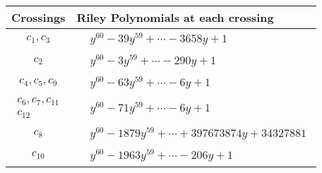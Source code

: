 \documentclass[1p]{elsarticle_modified}
\theoremstyle{definition}
\begin{document}
\begin{tabular}{m{50pt}|m{274pt}}
Crossings & \hspace{64pt}Riley Polynomials at each crossing \\
\hline $$\begin{aligned}c_{1},c_{3}\end{aligned}$$&$\begin{aligned}
&y^{60}-39 y^{59}+\cdots-3658 y+1
\end{aligned}$\\
\hline $$\begin{aligned}c_{2}\end{aligned}$$&$\begin{aligned}
&y^{60}-3 y^{59}+\cdots-290 y+1
\end{aligned}$\\
\hline $$\begin{aligned}c_{4},c_{5},c_{9}\end{aligned}$$&$\begin{aligned}
&y^{60}-63 y^{59}+\cdots-6 y+1
\end{aligned}$\\
\hline $$\begin{aligned}c_{6},c_{7},c_{11}\\c_{12}\end{aligned}$$&$\begin{aligned}
&y^{60}-71 y^{59}+\cdots-6 y+1
\end{aligned}$\\
\hline $$\begin{aligned}c_{8}\end{aligned}$$&$\begin{aligned}
&y^{60}-1879 y^{59}+\cdots+397673874 y+34327881
\end{aligned}$\\
\hline $$\begin{aligned}c_{10}\end{aligned}$$&$\begin{aligned}
&y^{60}-1963 y^{59}+\cdots-206 y+1
\end{aligned}$\\
\hline
\end{tabular}
\vskip 2pc
\end{document}
